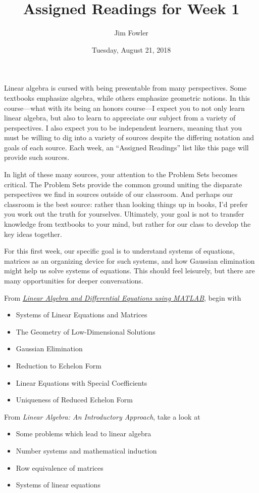\documentclass{homework}
\author{Jim Fowler}
\title{Assigned Readings for Week 1}
\date{Tuesday, August 21, 2018}
\begin{document}
\maketitle

Linear algebra is cursed with being presentable from many
perspectives.  Some textbooks emphasize algebra, while others
emphasize geometric notions.  In this course---what with its being an
honors course---I expect you to not only learn linear algebra, but
also to learn to appreciate our subject from a variety of
perspectives.  I also expect you to be independent learners, meaning
that you must be willing to dig into a variety of sources despite the
differing notation and goals of each source.  Each week, an ``Assigned
Readings'' list like this page will provide such sources.

In light of these many sources, your attention to the Problem Sets
becomes critical.  The Problem Sets provide the common ground uniting
the disparate perspectives we find in sources outside of our
classroom.  And perhaps our classroom is the best source: rather than
looking things up in books, I'd prefer you work out the truth for
yourselves.  Ultimately, your goal is not to transfer knowledge from
textbooks to your mind, but rather for our class to develop the key
ideas together.

For this first week, our specific goal is to understand systems of
equations, matrices as an organizing device for such systems, and how
Gaussian elimination might help us solve systems of equations.  This
should feel leisurely, but there are many opportunities for deeper
conversations.

From \textit{\href{/courses/43735/files/folder/textbooks}{Linear Algebra and
  Differential Equations using MATLAB}}, begin with
\begin{itemize}
\item {} Systems of Linear Equations and Matrices
\item {} The Geometry of Low-Dimensional Solutions
\item {} Gaussian Elimination
\item {} Reduction to Echelon Form
\item {} Linear Equations with Special Coefficients
\item {} Uniqueness of Reduced Echelon Form
\end{itemize}

From \textit{Linear Algebra: An Introductory Approach}, take a look at
\begin{itemize}
\item {} Some problems which lead to linear algebra
\item {} Number systems and mathematical induction
\item {} Row equivalence of matrices
\item {} Systems of linear equations
\end{itemize}
\end{document}
